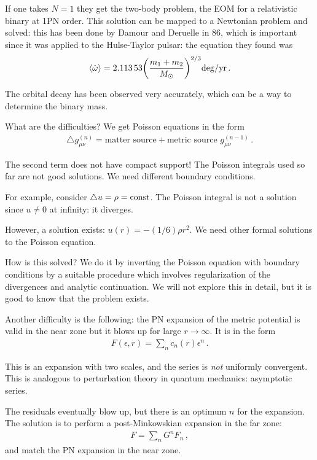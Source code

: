 \documentclass[main.tex]{subfiles}
\begin{document}
If one takes \(N = 1\) they get the two-body problem, the EOM for a relativistic binary at 1PN order. 
This solution can be mapped to a Newtonian problem and solved: this has been done by Damour and Deruelle in 86, which is important since it was applied to the Hulse-Taylor pulsar: the equation they found was 
%
\begin{align}
\expval{\dot{\omega}} = \num{2.11353} \qty(\frac{m_1 + m_2 }{M_{\odot}})^{2/3} \SI{}{deg / yr}
\,.
\end{align}

The orbital decay has been observed very accurately, which can be a way to determine the binary mass. 

What are the difficulties? We get Poisson equations in the form 
%
\begin{align}
\triangle g_{\mu \nu }^{(n)} = \text{matter source} + \text{metric source } g_{\mu \nu }^{(n-1)}
\,.
\end{align}

The second term does not have compact support! The Poisson integrals used so far are not good solutions. 
We need different boundary conditions. 

For example, consider \(\triangle u = \rho = \text{const}\). The Poisson integral is not a solution since \(u \neq 0\) at infinity: it diverges.

However, a solution exists: \(u(r) = - (1/6) \rho r^2\). We need other formal solutions to the Poisson equation. 

How is this solved? We do it by inverting the Poisson equation with boundary conditions by a suitable procedure which involves regularization of the divergences and analytic continuation. 
We will not explore this in detail, but it is good to know that the problem exists. 

Another difficulty is the following: 
the PN expansion of the metric potential is valid in the near zone but it blows up for large \(r \to \infty \).
It is in the form 
%
\begin{align}
F (\epsilon , r) = \sum _{n} c_n (r) \epsilon^n
\,.
\end{align}

This is an expansion with two scales, and the series is \emph{not} uniformly convergent. This is analogous to perturbation theory in quantum mechanics: asymptotic series. 

The residuals eventually blow up, but there is an optimum \(n\) for the expansion. 
The solution is to perform a post-Minkowskian expansion in the far zone: 
%
\begin{align}
F = \sum _{n} G^{n} F_n
\,,
\end{align}
%
and match the PN expansion in the near zone. 
\end{document}
